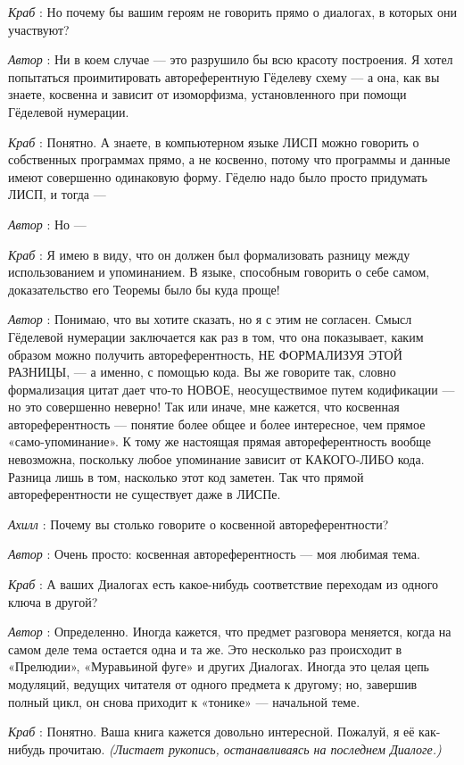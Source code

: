 \documentclass[../main.tex]{subfiles}
\begin{document}
\begin{dialogue}
\emph{Краб} : Но почему бы вашим героям не говорить прямо о диалогах, в которых они участвуют?

\emph{Автор} : Ни в коем случае --- это разрушило бы всю красоту построения. Я хотел попытаться проимитировать автореферентную Гёделеву схему --- а она, как вы знаете, косвенна и зависит от изоморфизма, установленного при помощи Гёделевой нумерации.

\emph{Краб} : Понятно. А знаете, в компьютерном языке ЛИСП можно говорить о собственных программах прямо, а не косвенно, потому что программы и данные имеют совершенно одинаковую форму. Гёделю надо было просто придумать ЛИСП, и тогда ---

\emph{Автор} : Но ---

\emph{Краб} : Я имею в виду, что он должен был формализовать разницу между использованием и упоминанием. В языке, способным говорить о себе самом, доказательство его Теоремы было бы куда проще!

\emph{Автор} : Понимаю, что вы хотите сказать, но я с этим не согласен. Смысл Гёделевой нумерации заключается как раз в том, что она показывает, каким образом можно получить автореферентность, НЕ ФОРМАЛИЗУЯ ЭТОЙ РАЗНИЦЫ, --- а именно, с помощью кода. Вы же говорите так, словно формализация цитат дает что-то НОВОЕ, неосуществимое путем кодификации --- но это совершенно неверно! Так или иначе, мне кажется, что косвенная автореферентность --- понятие более общее и более интересное, чем прямое «само-упоминание». К тому же настоящая прямая автореферентность вообще невозможна, поскольку любое упоминание зависит от КАКОГО-ЛИБО кода. Разница лишь в том, насколько этот код заметен. Так что прямой автореферентности не существует даже в ЛИСПе.

\emph{Ахилл} : Почему вы столько говорите о косвенной автореферентности?

\emph{Автор} : Очень просто: косвенная автореферентность --- моя любимая тема.

\emph{Краб} : А ваших Диалогах есть какое-нибудь соответствие переходам из одного ключа в другой?

\emph{Автор} : Определенно. Иногда кажется, что предмет разговора меняется, когда на самом деле тема остается одна и та же. Это несколько раз происходит в «Прелюдии», «Муравьиной фуге» и других Диалогах. Иногда это целая цепь модуляций, ведущих читателя от одного предмета к другому; но, завершив полный цикл, он снова приходит к «тонике» --- начальной теме.

\emph{Краб} : Понятно. Ваша книга кажется довольно интересной. Пожалуй, я её как-нибудь прочитаю. \emph{(Листает рукопись, останавливаясь на последнем Диалоге.)}


\end{dialogue}
\end{document}
